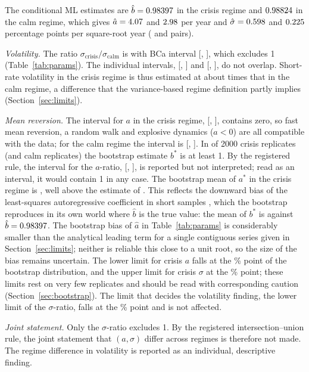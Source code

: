 \documentclass[11pt,a4paper]{article}
\begin{document}
The conditional ML estimates are $\hat b=0.98397$ in the crisis regime and $0.98824$ in the calm regime, which gives $\hat a=4.07$ and $2.98$ per year and $\hat\sigma=0.598$ and $0.225$ percentage points per square-root year (\nK{} and \nR{} pairs).

\emph{Volatility.} The ratio $\sigma_{\mathrm{crisis}}/\sigma_{\mathrm{calm}}$ is \PtsRatio{} with BCa interval [\CIsRatiolo, \CIsRatiohi], which excludes 1 (Table~\ref{tab:params}). The individual intervals, [\CIsKlo, \CIsKhi] and [\CIsRlo, \CIsRhi], do not overlap. Short-rate volatility in the crisis regime is thus estimated at about \PtsRatioRound{} times that in the calm regime, a difference that the variance-based regime definition partly implies (Section~\ref{sec:limits}).

\emph{Mean reversion.} The interval for $a$ in the crisis regime, [\CIaKlo, \CIaKhi], contains zero, so fast mean reversion, a random walk and explosive dynamics ($a<0$) are all compatible with the data; for the calm regime the interval is [\CIaRlo, \CIaRhi]. In \NbOneK{} of 2000 crisis replicates (and \NbOneR{} calm replicates) the bootstrap estimate $b^*$ is at least 1. By the registered rule, the interval for the $a$-ratio, [\CIaRatiolo, \CIaRatiohi], is reported but not interpreted; read as an interval, it would contain 1 in any case. The bootstrap mean of $a^*$ in the crisis regime is \MeanaK{}, well above the estimate of \aK{}. This reflects the downward bias of the least-squares autoregressive coefficient in short samples \citep[eq.~2.7]{tangchen2009}, which the bootstrap reproduces in its own world where $\hat b$ is the true value: the mean of $b^*$ is \MeanbK{} against $\hat b=0.98397$. The bootstrap bias of $\hat a$ in Table~\ref{tab:params} is considerably smaller than the analytical leading term for a single contiguous series given in Section~\ref{sec:limits}; neither is reliable this close to a unit root, so the size of the bias remains uncertain. The lower limit for crisis $a$ falls at the \PloaK\% point of the bootstrap distribution, and the upper limit for crisis $\sigma$ at the \PhisK\% point; these limits rest on very few replicates and should be read with corresponding caution (Section~\ref{sec:bootstrap}). The limit that decides the volatility finding, the lower limit of the $\sigma$-ratio, falls at the \PlosRatio\% point and is not affected.

\emph{Joint statement.} Only the $\sigma$-ratio excludes 1. By the registered intersection--union rule, the joint statement that $(a,\sigma)$ differ across regimes is therefore not made. The regime difference in volatility is reported as an individual, descriptive finding.
\end{document}
